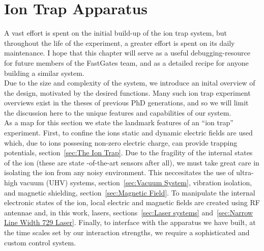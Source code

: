 \chapter{Ion Trap Apparatus}
\minitoc

    A vast effort is spent on the initial build-up of the ion trap system, but
    throughout the life of the experiment, a greater effort is spent on its daily
    maintenance.  I hope that this chapter will serve as a useful debugging-resource for future
    members of the FastGates team, and as a detailed recipe for anyone
    building a similar system. \\

    Due to the size and complexity of the system, we introduce an inital overview of
    the design, motivated by the desired functions.  
    Many such  ion trap experiment overviews exist in the theses of previous PhD
    generations, and so we will limit the discussion here to the unique features
    and capabilities of our system.\\
    
    As a map for this section we state the landmark features of an ``ion trap''
    experiment. First, to confine the ions static and dynamic electric fields
    are used which, due to ions possesing non-zero electric charge, can provide
    trapping potentials, section~\ref{sec:The Ion Trap}. Due to the fragility of
    the internal states of the ion (these are state -of-the-art sensors after
    all), we must take great care in isolating the ion from any noisy
    environment. This neccesitates the use of ultra-high vacuum (UHV) systems,
    section~\ref{sec:Vacuum System}, vibration isolation, and magnetic
    shielding, section~\ref{sec:Magnetic Field}. To manipulate the internal
    electronic states of the ion, local electric and magnetic fields
    are created using RF antennae and, in this work, lasers, sections~\ref{sec:Laser
    systems} and~\ref{sec:Narrow Line Width 729 Laser}.  Finally, to interface
    with the apparatus we have built, at the time scales set by our interaction
    strengths, we require a sophisticated and custom control system.



